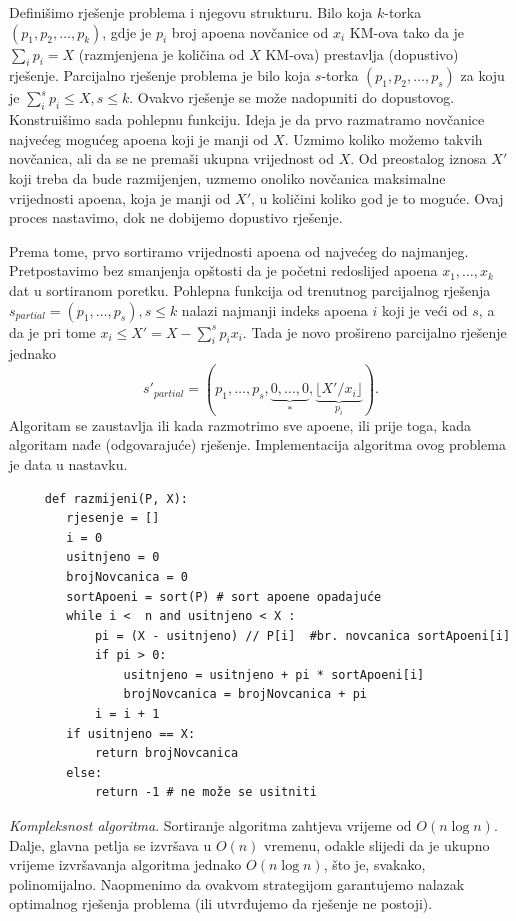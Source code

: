\begin{solution}
	 Definišimo rješenje problema i njegovu strukturu. Bilo koja $k$-torka $(p_1, p_2, \ldots , p_k )$, gdje je $p_i$ broj
	 apoena novčanice od $x_i$ KM-ova tako da je $\sum_i p_i = X$
	 (razmjenjena je količina od $X$ KM-ova) prestavlja (dopustivo) rješenje. 
	 Parcijalno rješenje problema je bilo koja $s$-torka $(p_1, p_2, \ldots , p_s )$ za koju je $\sum_i^s p_i \leq X, s \leq k$.  Ovakvo rješenje se može nadopuniti do dopustovog. \\ 
	 
	 Konstruišimo sada pohlepnu funkciju. Ideja je da prvo razmatramo novčanice najvećeg mogućeg apoena koji je manji od $X$. Uzmimo  koliko možemo takvih novčanica, ali da se ne premaši ukupna vrijednost od $X$. Od preostalog iznosa $X'$ koji treba da bude razmijenjen, uzmemo onoliko novčanica maksimalne vrijednosti apoena, koja je manji od $X'$, u količini koliko god je to  moguće. Ovaj proces nastavimo, dok ne dobijemo dopustivo rješenje. 
	 
	 Prema tome, prvo sortiramo vrijednosti apoena od najvećeg do najmanjeg. Pretpostavimo bez smanjenja opštosti da je  početni redoslijed apoena $x_1, \ldots, x_k$ dat u sortiranom poretku. Pohlepna funkcija od trenutnog parcijalnog rješenja $s_{partial}=(p_1, \ldots, p_s), s \leq k$ nalazi najmanji indeks apoena $i$ koji je veći od $s$, a da je pri tome $x_i \leq X'= X - \sum_i^s p_i x_i$. Tada je novo prošireno parcijalno rješenje jednako 
	 $$s'_{partial}=(p_1, \ldots, p_s,\underbrace{0,\ldots, 0}_{*}, \underbrace{\lfloor X'/x_i \rfloor}_{p_i} ).$$ 
	 Algoritam se zaustavlja ili kada razmotrimo sve apoene, ili prije toga, kada algoritam nađe (odgovarajuće) rješenje. Implementacija algoritma ovog problema  je data u nastavku.
	 \begin{verbatim}
	 def razmijeni(P, X):
	 	rjesenje = []
	 	i = 0
	 	usitnjeno = 0
	 	brojNovcanica = 0
	 	sortApoeni = sort(P) # sort apoene opadajuće
	 	while i <  n and usitnjeno < X :
	 		pi = (X - usitnjeno) // P[i]  #br. novcanica sortApoeni[i]
	 		if pi > 0:
	 			usitnjeno = usitnjeno + pi * sortApoeni[i]
	 			brojNovcanica = brojNovcanica + pi
	 		i = i + 1
	 	if usitnjeno == X:
	 		return brojNovcanica
	 	else:
	 		return -1 # ne može se usitniti
	 \end{verbatim} 
\end{solution}

\textit{Kompleksnost algoritma}. Sortiranje algoritma zahtjeva vrijeme od $O(n \log n)$. Dalje, glavna petlja se izvršava u $O(n)$ vremenu, odakle slijedi da je ukupno vrijeme izvršavanja algoritma jednako $O(n \log n)$, što je, svakako, polinomijalno.  Naopmenimo da ovakvom strategijom garantujemo nalazak optimalnog rješenja problema (ili utvrđujemo da rješenje ne postoji). 



